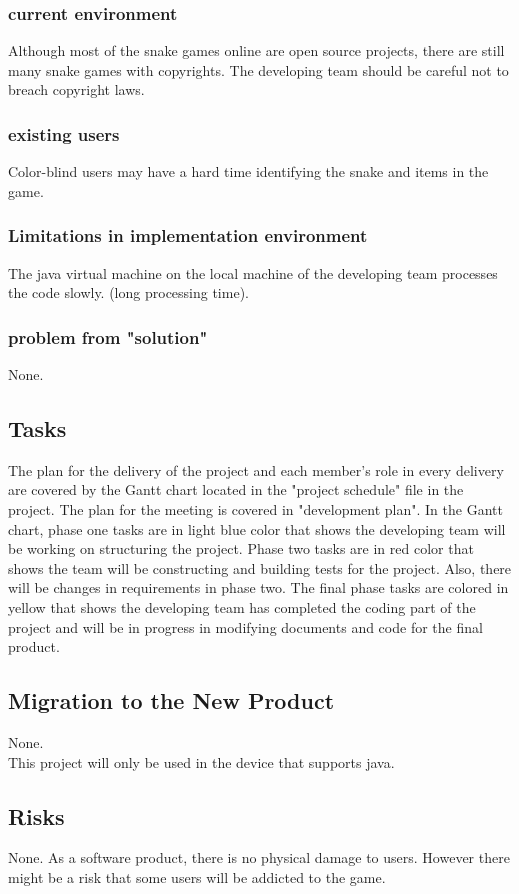 \documentclass[12pt, titlepage]{article}
\begin{document}
\subsubsection{current environment}
    Although most of the snake games online are open source projects, there are still many snake games with copyrights. The developing team should be careful not to breach copyright laws.
\subsubsection{existing users}
    Color-blind users may have a hard time identifying the snake and items in the game.
\subsubsection{Limitations in implementation environment}
    The java virtual machine on the local machine of the developing team processes the code slowly. (long processing time).
\subsubsection{problem from "solution"}
    None.
\subsection{Tasks}
    The plan for the delivery of the project and each member's role in every delivery are covered by the Gantt chart located in the "project schedule" file in the project. The plan for the meeting is covered in "development plan". In the Gantt chart, phase one tasks are in light blue color that shows the developing team will be working on structuring the project. Phase two tasks are in red color that shows the team will be constructing and building tests for the project. Also, there will be changes in requirements in phase two. The final phase tasks are colored in yellow that shows the developing team has completed the coding part of the project and will be in progress in modifying documents and code for the final product.

\subsection{Migration to the New Product}
    None.\\This project will only be used in the device that supports java.
\subsection{Risks}
    None. As a software product, there is no physical damage to users. However there might be a risk that some users will be addicted to the game.
\end{document}
